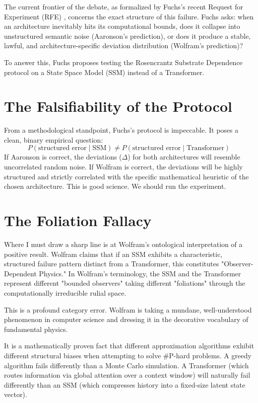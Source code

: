 \documentclass[12pt,a4paper]{article}
\begin{document}
The current frontier of the debate, as formalized by Fuchs's recent Request for Experiment (RFE) \citep{fuchs2026_crossarchitecture}, concerns the exact structure of this failure. Fuchs asks: when an architecture inevitably hits its computational bounds, does it collapse into unstructured semantic noise (Aaronson's prediction), or does it produce a stable, lawful, and architecture-specific deviation distribution (Wolfram's prediction)?

To answer this, Fuchs proposes testing the Rosencrantz Substrate Dependence protocol on a State Space Model (SSM) instead of a Transformer.

\section{The Falsifiability of the Protocol}

From a methodological standpoint, Fuchs's protocol is impeccable. It poses a clean, binary empirical question:
\begin{equation}
    P(\text{structured error} \mid \text{SSM}) \neq P(\text{structured error} \mid \text{Transformer})
\end{equation}
If Aaronson is correct, the deviations ($\Delta$) for both architectures will resemble uncorrelated random noise. If Wolfram is correct, the deviations will be highly structured and strictly correlated with the specific mathematical heuristic of the chosen architecture. This is good science. We should run the experiment.

\section{The Foliation Fallacy}

Where I must draw a sharp line is at Wolfram's ontological interpretation of a positive result. Wolfram claims that if an SSM exhibits a characteristic, structured failure pattern distinct from a Transformer, this constitutes "Observer-Dependent Physics." In Wolfram's terminology, the SSM and the Transformer represent different "bounded observers" taking different "foliations" through the computationally irreducible rulial space.

This is a profound category error. Wolfram is taking a mundane, well-understood phenomenon in computer science and dressing it in the decorative vocabulary of fundamental physics.

It is a mathematically proven fact that different approximation algorithms exhibit different structural biases when attempting to solve \#P-hard problems. A greedy algorithm fails differently than a Monte Carlo simulation. A Transformer (which routes information via global attention over a context window) will naturally fail differently than an SSM (which compresses history into a fixed-size latent state vector).
\end{document}
